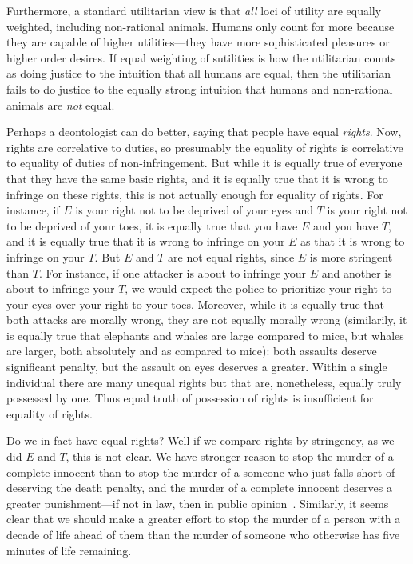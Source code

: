 Furthermore, a standard utilitarian view is that \textit{all} loci of utility are equally weighted, including
non-rational animals. Humans only count for more because they are capable of higher utilities---they have more
sophisticated pleasures or higher order desires. If equal weighting of sutilities
is how the utilitarian counts as doing justice to the intuition that all humans are equal, then the utilitarian
fails to do justice to the equally strong intuition that humans and non-rational animals are \textit{not} equal.

Perhaps a deontologist can do better, saying that people have equal \textit{rights}. Now, rights are correlative to 
duties, so presumably the
equality of rights is correlative to equality of duties of non-infringement. But while it is 
equally true of everyone that they have the same basic rights, and it is equally true that it is
wrong to infringe on these rights, this is not actually enough for equality of rights. For instance, 
if $E$ is your right not to be deprived of your eyes and $T$ is your right not to be deprived of your toes, 
it is equally true that you have $E$ and you have $T$, and it is equally true that it is wrong to 
infringe on your $E$ as that it is wrong to infringe on your $T$. But $E$ and $T$ are not equal rights, since
$E$ is more stringent than $T$. For instance, if one attacker is about to infringe your $E$ and another is about
to infringe your $T$, we would expect the police to prioritize your right to your eyes over your right to your
toes. Moreover, while it is equally true that both attacks are morally wrong, they are not equally morally wrong 
(similarily, it is equally true that elephants and whales are large compared to mice, but whales are larger, both
absolutely and as compared to mice): both assaults deserve significant penalty, but the assault on eyes deserves
a greater. Within a single individual there are many unequal rights but that are, nonetheless, equally truly possessed
by one. Thus equal truth of possession of rights is insufficient for equality of rights.

Do we in fact have equal rights? Well if we compare rights by stringency, as we did $E$ and $T$, this is not clear.
We have stronger reason to stop the murder of a complete innocent than to stop the murder of a someone who just falls
short of deserving the death penalty, and the murder of a complete innocent deserves a greater punishment---if not in law, then in public opinion~. Similarly, it seems clear that we should make a greater effort to stop the murder of a person
with a decade of life ahead of them than the murder of someone who otherwise has five minutes of life remaining.

